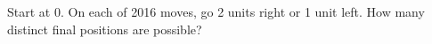 Start at 0. On each of 2016 moves, go 2 units right or 1 unit left. How many distinct final positions are possible?
